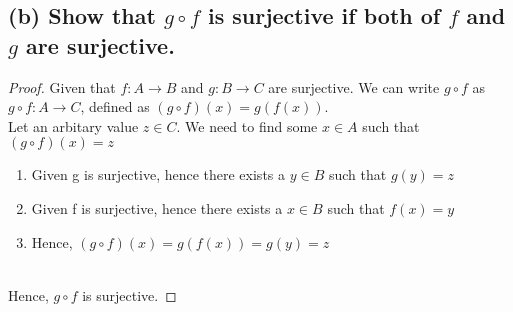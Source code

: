\documentclass{article}
\begin{document}
\subsection*{(b) Show that $g \circ f$ is surjective if both of $f$ and $g$ are surjective.}

\begin{proof}
    Given that $f : A \rightarrow B$ and $g : B \rightarrow C$ are surjective. 
    We can write $g \circ f$ as $g \circ f: A \rightarrow C$, defined as $(g \circ f)(x) = g(f(x))$.
    \\
    Let an arbitary value $z \in C$. We need to find some $x \in A$ such that $(g \circ f)(x) = z$
    \begin{enumerate}
        \item Given g is surjective, hence there exists a $y \in B$ such that $g(y) = z$
        \item Given f is surjective, hence there exists a $x \in B$ such that $f(x) = y$
        \item Hence, $(g \circ f)(x) = g(f(x)) = g(y) = z$
    \end{enumerate}
    \\
    Hence, $g \circ f$ is surjective.
\end{proof}
\end{document}
